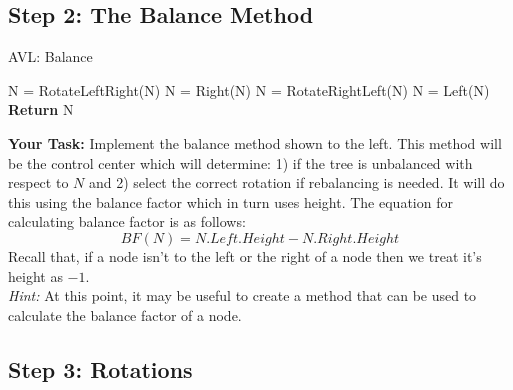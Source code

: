 \documentclass[a4paper]{article}
\begin{document}
\subsection{Step 2: The Balance Method}

\begin{minipage}{0.48\textwidth}
	\begin{algorithm}[H]
		\caption{AVL: Balance}\label{}
		\begin{algorithmic}[1]
			\State N = RotateLeftRight(N)
			\Else
			\State N = Right(N)
			\EndIf
			\State N = RotateRightLeft(N)
			\Else
			\State N = Left(N)
			\EndIf
			\EndIf
			\State \textbf{Return} N
			\EndProcedure
		\end{algorithmic}
	\end{algorithm}
\end{minipage}
\hfill
\begin{minipage}{0.48\textwidth}
\textbf{Your Task:} Implement the balance method shown to the left. This method
will be the control center which will determine: 1) if the tree is unbalanced
with respect to $N$ and 2) select the correct rotation if rebalancing is
needed. It will do this using the balance factor which in turn uses height. The
equation for calculating balance factor is as follows:
\[BF(N) = N.Left.Height - N.Right.Height\]
Recall that, if a node isn't to the left or the right of a node then we treat it's height as $-1$.\\

\textit{Hint:} At this point, it may be useful to create a method that  can be
used to calculate the balance factor of a node.
\end{minipage}



\subsection{Step 3: Rotations}
\end{document}
